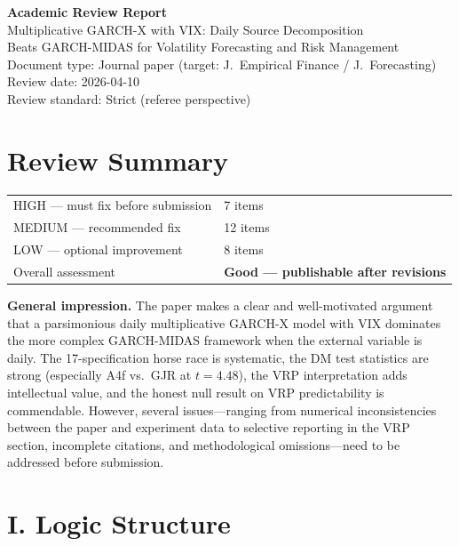 \documentclass[12pt,a4paper]{article}
\begin{document}
\begin{center}
{\Large\bfseries Academic Review Report}\\[0.5em]
{\large Multiplicative GARCH-X with VIX: Daily Source Decomposition\\Beats GARCH-MIDAS for Volatility Forecasting and Risk Management}\\[0.5em]
{\normalsize Document type: Journal paper (target: J.\ Empirical Finance / J.\ Forecasting)}\\
{\normalsize Review date: 2026-04-10}\\
{\normalsize Review standard: Strict (referee perspective)}
\end{center}

\section*{Review Summary}

\begin{tabular}{ll}
\textcolor{errorred}{HIGH --- must fix before submission} & 7 items \\
\textcolor{warncolor}{MEDIUM --- recommended fix} & 12 items \\
LOW --- optional improvement & 8 items \\
Overall assessment & \textbf{Good --- publishable after revisions} \\
\end{tabular}

\bigskip

\noindent\textbf{General impression.}
The paper makes a clear and well-motivated argument that a parsimonious daily multiplicative GARCH-X model with VIX dominates the more complex GARCH-MIDAS framework when the external variable is daily. The 17-specification horse race is systematic, the DM test statistics are strong (especially A4f vs.\ GJR at $t = 4.48$), the VRP interpretation adds intellectual value, and the honest null result on VRP predictability is commendable. However, several issues---ranging from numerical inconsistencies between the paper and experiment data to selective reporting in the VRP section, incomplete citations, and methodological omissions---need to be addressed before submission.

\section*{I. Logic Structure}
\end{document}
